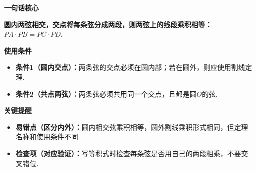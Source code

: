 \begin{summarybox}
	\textbf{\textcolor{CSummary}{一句话核心}}

	\textbf{圆内两弦相交，交点将每条弦分成两段，则两弦上的线段乘积相等：$PA\cdot PB = PC\cdot PD$.}

	\medskip
	\textbf{\textcolor{CSummary}{使用条件}}

	\begin{itemize}[leftmargin=*, itemsep=0.5em, topsep=0.4em]
		\item \textbf{条件1（圆内交点）：}两条弦的交点必须在圆内部；若在圆外，则应使用割线定理.
		\item \textbf{条件2（共点两弦）：}两条弦必须共用同一个交点，且都是圆$O$的弦.
	\end{itemize}

	\medskip
	\textbf{\textcolor{CSummary}{关键提醒}}

	\begin{itemize}[leftmargin=*, itemsep=0.5em, topsep=0.4em]
		\item \textbf{易错点（区分内外）：}圆内相交弦乘积相等，圆外割线乘积形式相同，但定理名称和使用条件不同.
		\item \textbf{检查项（对应验证）：}写等积式时检查每条弦是否用自己的两段相乘，不要交叉错位.
	\end{itemize}
\end{summarybox}